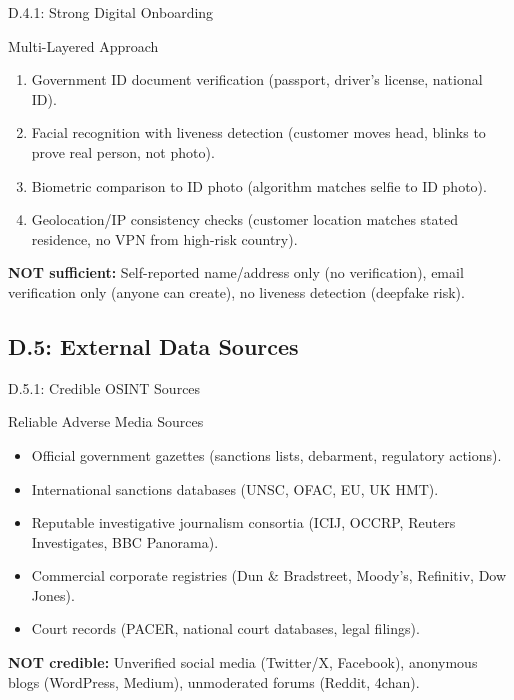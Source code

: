 \documentclass{beamer}
\begin{document}
	\begin{frame}{D.4.1: Strong Digital Onboarding}
		\begin{block}{Multi-Layered Approach}
			\begin{enumerate}
				\item Government ID document verification (passport, driver's license, national ID).
				\item Facial recognition with liveness detection (customer moves head, blinks to prove real person, not photo).
				\item Biometric comparison to ID photo (algorithm matches selfie to ID photo).
				\item Geolocation/IP consistency checks (customer location matches stated residence, no VPN from high-risk country).
			\end{enumerate}
		\end{block}
		\textbf{NOT sufficient:} Self-reported name/address only (no verification), email verification only (anyone can create), no liveness detection (deepfake risk).
	\end{frame}
	
	\subsection{D.5: External Data Sources}
	
	\begin{frame}{D.5.1: Credible OSINT Sources}
		\begin{block}{Reliable Adverse Media Sources}
			\begin{itemize}
				\item Official government gazettes (sanctions lists, debarment, regulatory actions).
				\item International sanctions databases (UNSC, OFAC, EU, UK HMT).
				\item Reputable investigative journalism consortia (ICIJ, OCCRP, Reuters Investigates, BBC Panorama).
				\item Commercial corporate registries (Dun \& Bradstreet, Moody's, Refinitiv, Dow Jones).
				\item Court records (PACER, national court databases, legal filings).
			\end{itemize}
		\end{block}
		\textbf{NOT credible:} Unverified social media (Twitter/X, Facebook), anonymous blogs (WordPress, Medium), unmoderated forums (Reddit, 4chan).
	\end{frame}
	
\end{document}
